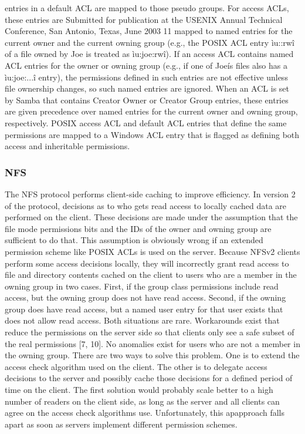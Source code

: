 entries in a default ACL are mapped to those
pseudo groups. For access ACLs, these entries are
Submitted for publication at the USENIX Annual Technical Conference, San Antonio, Texas, June 2003 11
mapped to named entries for the current owner and
the current owning group (e.g., the POSIX ACL entry
ìu::rwî of a file owned by Joe is treated as
ìu:joe:rwî).
If an access ACL contains named ACL entries
for the owner or owning group (e.g., if one of Joeís
files also has a ìu:joe:...î entry), the permissions
defined in such entries are not effective unless
file ownership changes, so such named entries are
ignored. When an ACL is set by Samba that contains
Creator Owner or Creator Group entries, these
entries are given precedence over named entries for
the current owner and owning group, respectively.
 POSIX access ACL and default ACL entries that
define the same permissions are mapped to a Windows
ACL entry that is flagged as defining both access
and inheritable permissions.


\subsubsection*{NFS}

The NFS protocol performs client-side caching to improve
efficiency. In version 2 of the protocol, decisions
as to who gets read access to locally cached data are performed
on the client. These decisions are made under
the assumption that the file mode permissions bits and
the IDs of the owner and owning group are sufficient to
do that. This assumption is obviously wrong if an extended
permission scheme like POSIX ACLs is used on
the server.
Because NFSv2 clients perform some access decisions
locally, they will incorrectly grant read access to
file and directory contents cached on the client to users
who are a member in the owning group in two cases.
First, if the group class permissions include read access,
but the owning group does not have read access. Second,
if the owning group does have read access, but a named
user entry for that user exists that does not allow read
access. Both situations are rare. Workarounds exist that
reduce the permissions on the server side so that clients
only see a safe subset of the real permissions [7, 10]. No
anomalies exist for users who are not a member in the
owning group.
There are two ways to solve this problem. One is to
extend the access check algorithm used on the client.
The other is to delegate access decisions to the server
and possibly cache those decisions for a defined period
of time on the client. The first solution would probably
scale better to a high number of readers on the client
side, as long as the server and all clients can agree on
the access check algorithms use. Unfortunately, this apapproach
falls apart as soon as servers implement different
permission schemes.

% 
% 

